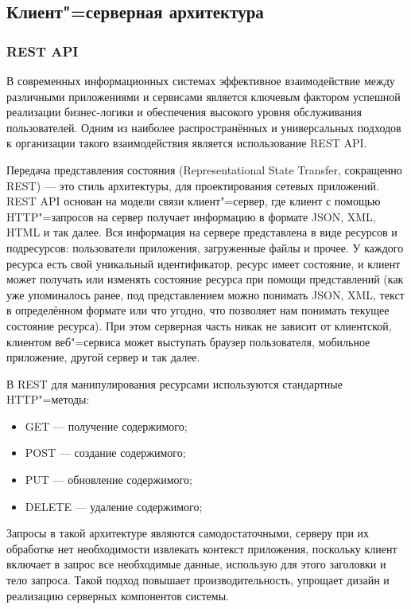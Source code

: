 \subsection{Клиент"=серверная архитектура}

\subsubsection{REST API}
В современных информационных системах эффективное взаимодействие между различными приложениями и сервисами является ключевым фактором успешной реализации бизнес-логики и обеспечения высокого уровня обслуживания пользователей. Одним из наиболее распространённых и универсальных подходов к организации такого взаимодействия является использование REST API.

Передача представления состояния (Representational State Transfer, сокращенно REST) --- это стиль архитектуры, для проектирования сетевых приложений. REST API основан на модели связи клиент"=сервер, где клиент с помощью HTTP"=запросов на сервер получает информацию в формате JSON, XML, HTML и так далее. Вся информация на сервере представлена в виде ресурсов и подресурсов: пользователи приложения, загруженные файлы и прочее. У каждого ресурса есть свой уникальный идентификатор, ресурс имеет состояние, и клиент может получать или изменять состояние ресурса при помощи представлений (как уже упоминалось ранее, под представлением можно понимать JSON, XML, текст в определённом формате или что угодно, что позволяет нам понимать текущее состояние ресурса). При этом серверная часть никак не зависит от клиентской, клиентом веб"=сервиса может выступать браузер пользователя, мобильное приложение, другой сервер и так далее.

В REST для манипулирования ресурсами используются стандартные HTTP"=методы:
\begin{itemize}
	\item{GET --- получение содержимого;}
	\item{POST --- создание содержимого;}
	\item{PUT --- обновление содержимого;}
	\item{DELETE --- удаление содержимого;}
\end{itemize}

Запросы в такой архитектуре являются самодостаточными, серверу при их обработке нет необходимости извлекать контекст приложения, поскольку клиент включает в запрос все необходимые данные, использую для этого заголовки и тело запроса. Такой подход повышает производительность, упрощает дизайн и реализацию серверных компонентов системы.

